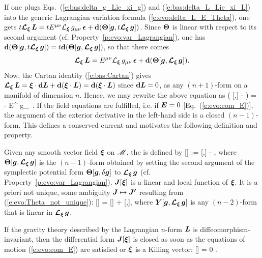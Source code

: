 If one plugs Eqs.~(\ref{e:bas:delta_g_Lie_xi_g}) and (\ref{e:bas:delta_L_Lie_xi_L})
into the generic Lagrangian variation formula (\ref{e:evo:delta_L_E_Theta}), one gets
$t \bm{\mathcal{L}}_{\bm{\xi}}\, \bm{L}  = t E^{\mu\nu} {\mathcal{L}}_{\bm{\xi}}\, g_{\mu\nu} \,\bm{\epsilon} + \mathbf{d}( \bm{\Theta}[\bm{g},t\bm{\mathcal{L}}_{\bm{\xi}}\,\bm{g}])$.
Since $\bm{\Theta}$ is linear with respect to its second argument (cf. Property~\ref{p:evo:var_Lagrangian}),
one has
$\mathbf{d}( \bm{\Theta}[\bm{g},t\bm{\mathcal{L}}_{\bm{\xi}}\,\bm{g}]) =  t \mathbf{d}( \bm{\Theta}[\bm{g},\bm{\mathcal{L}}_{\bm{\xi}}\,\bm{g}])$, so that there comes
\[
    \bm{\mathcal{L}}_{\bm{\xi}}\, \bm{L}  = E^{\mu\nu} {\mathcal{L}}_{\bm{\xi}}\, g_{\mu\nu} \,\bm{\epsilon} + \mathbf{d}( \bm{\Theta}[\bm{g},\bm{\mathcal{L}}_{\bm{\xi}}\,\bm{g}]) .
\]
Now, the Cartan identity (\ref{e:bas:Cartan}) gives
$\bm{\mathcal{L}}_{\bm{\xi}}\, \bm{L} = \bm{\xi} \cdot\mathbf{d} \bm{L} + \mathbf{d}(\bm{\xi}\cdot\bm{L}) = \mathbf{d}(\bm{\xi}\cdot\bm{L})$
since $\mathbf{d} \bm{L} = 0$, as any $(n+1)$-form on a manifold of dimension $n$.
Hence, we may rewrite the above equation as
\be \label{e:evo:dd_pre_J_E}
    \dd\left(  \w{\Theta}[,\Lie{\xi}] - \w{\xi}\cdot{} \right) =
    - E^{\mu\nu} \Liec{\xi} g_{\mu\nu} \,\weps .
\ee
If the field equations are fulfilled, i.e. if $\bm{E} = 0$ [Eq.~(\ref{e:evo:eom_E})], the
argument of the exterior derivative in the left-hand side is a closed
$(n-1)$-form. This defines a conserved current and motivates the following definition and property.

\begin{prop}
\label{p:evo:Noether_current}
Given any smooth vector field $\bm{\xi}$ on $\mathscr{M}$,
the  is defined by \cite{Wald93,IyerW94}
\be \label{e:evo:def_Noether_current}
    [\w{\xi}] := \w{\Theta}[,\Lie{\xi}] - \w{\xi}\cdot{} ,
\ee
where $\bm{\Theta}[\bm{g},\bm{\mathcal{L}}_{\bm{\xi}}\,\bm{g}]$ is the $(n-1)$-form obtained by setting the second
argument of the symplectic potential form $\bm{\Theta}[\bm{g},\delta\bm{g}]$
to $\bm{\mathcal{L}}_{\bm{\xi}}\,\bm{g}$ (cf. Property~\ref{p:evo:var_Lagrangian}).
$\bm{J}[\bm{\xi}]$ is a linear and local function of $\bm{\xi}$. It is a priori not unique,
some ambiguity $\bm{J}\mapsto \bm{J'}$ resulting from (\ref{e:evo:Theta_not_unique}):
\be \label{e:evo:J_not_unique}
     [\w{\xi}] =  [\w{\xi}]  + \dd {}[,\Lie{\xi}],
\ee
where $\bm{Y}[\bm{g},\bm{\mathcal{L}}_{\bm{\xi}}\,\bm{g}]$ is any $(n-2)$-form that is linear in $\bm{\mathcal{L}}_{\bm{\xi}}\,\bm{g}$.

If the gravity theory described by the Lagrangian $n$-form $\bm{L}$ is diffeomorphism-invariant, then
the differential form $\bm{J}[\bm{\xi}]$ is closed as soon as the equations of motion (\ref{e:evo:eom_E}) are
satisfied or $\bm{\xi}$ is a Killing vector:
\be \label{e:evo:J_closed}
    \dd {}[\w{\xi}]  = 0 .
\ee
\end{prop}

